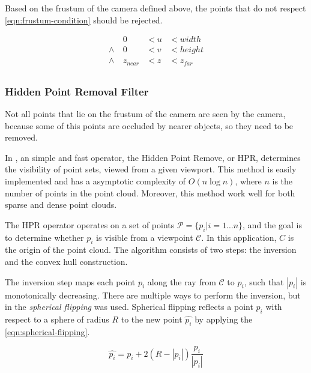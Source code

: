 Based on the frustum of the camera defined above, the points that do not respect \cref{eqn:frustum-condition} should be rejected.

\begin{equation}
    \label{eqn:frustum-condition}
    \begin{aligned}
                 & 0        & < u & < width \\
        \wedge \ & 0        & < v & < height \\
        \wedge \ & z_{near} & < z & < z_{far} \\
    \end{aligned}
\end{equation}

\subsubsection{Hidden Point Removal Filter}

Not all points that lie on the frustum of the camera are seen by the camera, because some of this points are occluded by nearer objects, so they need to be removed.

In \cite{katz07}, an simple and fast operator, the Hidden Point Remove, or HPR, determines the visibility of point sets, viewed from a given viewport. This method is easily implemented and has a asymptotic complexity of $O(n \log n)$, where $n$ is the number of points in the point cloud. Moreover, this method work well for both sparse and dense point clouds.

The HPR operator operates on a set of points $\mathcal{P} = \{p_i | i = 1 \dots n \}$, and the goal is to determine whether $p_i$ is visible from a viewpoint $\mathcal{C}$. In this application, $C$ is the origin of the point cloud. The algorithm consists of two steps: the inversion and the convex hull construction.

The inversion step maps each point $p_i$ along the ray from $\mathcal{C}$ to $p_i$, such that $|p_i|$ is monotonically decreasing. There are multiple ways to perform the inversion, but in \cite{katz07} the \emph{spherical flipping} was used. Spherical flipping reflects a point $p_i$ with respect to a sphere of radius $R$ to the new point $\hat{p_i}$ by applying the \cref{eqn:spherical-flipping}.

\begin{equation}
    \label{eqn:spherical-flipping}
    \hat{p_i} = p_i + 2 (R - |p_i|) \frac{p_i}{|p_i|}
\end{equation}

